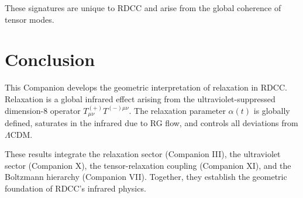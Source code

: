 \documentclass[11pt,a4paper]{article}
\begin{document}
These signatures are unique to RDCC and arise from the global coherence of
tensor modes.

\section{Conclusion}

This Companion develops the geometric interpretation of relaxation in RDCC.
Relaxation is a global infrared effect arising from the ultraviolet-suppressed
dimension-8 operator $T^{(+)}_{\mu\nu}T^{(-)\mu\nu}$. The relaxation parameter
$\alpha(t)$ is globally defined, saturates in the infrared due to RG flow, and
controls all deviations from $\Lambda$CDM.

These results integrate the relaxation sector (Companion III), the ultraviolet
sector (Companion X), the tensor-relaxation coupling (Companion XI), and the
Boltzmann hierarchy (Companion VII). Together, they establish the geometric
foundation of RDCC’s infrared physics.
\end{document}
